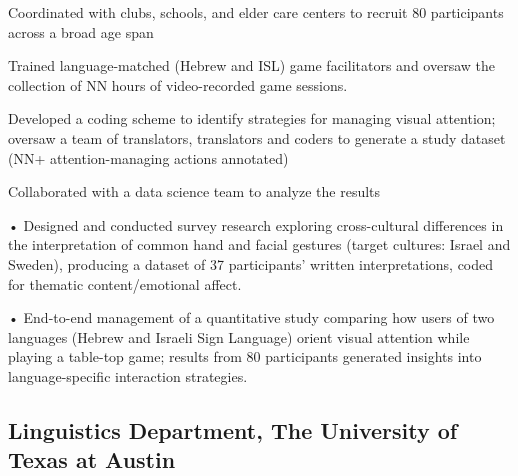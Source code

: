 Coordinated with clubs, schools, and elder care centers to recruit 80 participants across a broad age span

Trained language-matched (Hebrew and ISL) game facilitators and oversaw the collection of NN hours of video-recorded game sessions.

Developed a coding scheme to identify strategies for managing visual attention; oversaw a team of translators, translators and coders to generate a study dataset (NN+ attention-managing actions annotated)

Collaborated with a data science team to analyze the results


• Designed and conducted survey research exploring cross-cultural differences in the interpretation of common hand and facial gestures (target cultures: Israel and Sweden), producing a dataset of 37 participants' written interpretations, coded for thematic content/emotional affect.

• End-to-end management of a quantitative study comparing how users of two languages (Hebrew and Israeli Sign Language) orient visual attention while playing a table-top game; results from 80 participants generated insights into language-specific interaction strategies.

\subsection{Linguistics Department, The University of Texas at Austin}
